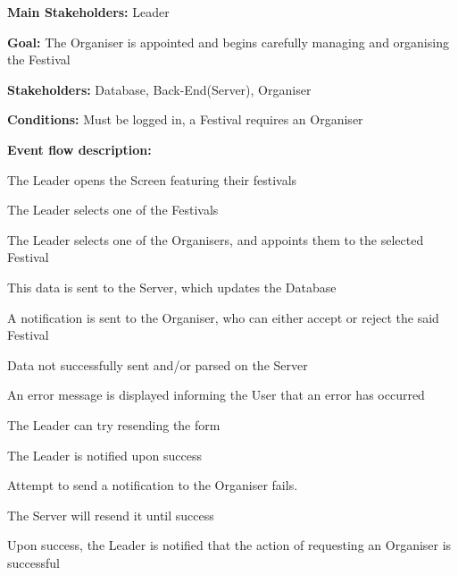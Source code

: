 				\noindent {}
				\begin{packed_item}
					\item \textbf{Main Stakeholders:} Leader
					\item \textbf{Goal:} The Organiser is appointed and begins carefully managing and organising the Festival
					\item \textbf{Stakeholders:} Database, Back-End(Server), Organiser
					\item \textbf{Conditions:} Must be logged in, a Festival requires an Organiser
					\item \textbf{Event flow description: }
					\begin{packed_enum}
						\item The Leader opens the Screen featuring their festivals
						\item The Leader selects one of the Festivals
						\item The Leader selects one of the Organisers, and appoints them to the selected Festival
						\item This data is sent to the Server, which updates the Database
						\item A notification is sent to the Organiser, who can either accept or reject the said Festival
					\end{packed_enum}
					
					\begin{packed_item}
						
						\item[4.a] Data not successfully sent and/or parsed on the Server
						\item[] \begin{packed_enum}
							\item An error message is displayed informing the User that an error has occurred
							\item The Leader can try resending the form
							\item The Leader is notified upon success
						\end{packed_enum}
					
						\item[5.a] Attempt to send a notification to the Organiser fails.
						\item[] \begin{packed_enum}
							\item The Server will resend it until success
							\item Upon success, the Leader is notified that the action of requesting an Organiser is successful
						\end{packed_enum}
						
					\end{packed_item}
				\end{packed_item}	
					
